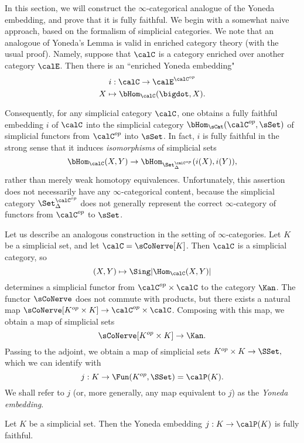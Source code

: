 In this section, we will construct the $\infty$-categorical analogue of the Yoneda embedding, and prove that it is fully faithful. We begin with a somewhat naive approach, based on the formalism of simplicial categories. We note that an analogoue of Yoneda's Lemma is valid in enriched category
theory (with the usual proof). Namely, suppose that $\calC$ is a category enriched over another category $\calE$. Then there is an ``enriched Yoneda embedding"
$$ i: \calC \rightarrow \calE^{\calC^{op}}$$
$$ X \mapsto \bHom_{\calC}( \bigdot, X).$$

Consequently, for any simplicial
category $\calC$, one obtains a fully faithful embedding $i$ of
$\calC$ into the simplicial category $\bHom_{\sCat}(\calC^{op}, \sSet)$ of
simplicial functors from $\calC^{op}$ into $\sSet$. In fact, $i$
is fully faithful in the strong sense that it induces {\em
isomorphisms} of simplicial sets$$ \bHom_{\calC}(X,Y) \rightarrow
\bHom_{\Set_{\Delta}^{\calC^{op}}}(i(X), i(Y)),$$ rather than merely
weak homotopy equivalences. Unfortunately, this assertion does not
necessarily have any $\infty$-categorical content, because the 
simplicial category $\Set_{\Delta}^{\calC^{op}}$ does not generally
represent the correct $\infty$-category of functors from
$\calC^{op}$ to $\sSet$.

Let us describe an analogous construction in the setting of $\infty$-categories. Let $K$ be a simplicial set, and let
$\calC = \sCoNerve[K]$. Then $\calC$ is a simplicial category, so
$$ (X,Y) \mapsto \Sing|\Hom_{\calC}(X,Y)|$$
determines a simplicial functor from
$ \calC^{op} \times \calC$ to the category $\Kan$.
The functor $\sCoNerve$ does not commute with products, but there
exists a natural map $\sCoNerve[K^{op} \times K] \rightarrow
\calC^{op} \times \calC$. Composing with this map, we obtain a map
of simplicial sets
$$ \sCoNerve[K^{op} \times K] \rightarrow \Kan.$$
Passing to the adjoint, we obtain a map of simplicial sets
$K^{op} \times K \rightarrow \SSet,$ which we can identify
with $$j: K \rightarrow
\Fun(K^{op}, \SSet) = \calP(K).$$
We shall refer to $j$ (or, more generally, any map equivalent to
$j$) as the {\it Yoneda embedding}.

\begin{proposition}\label{fulfaith}
Let $K$ be a simplicial set. Then the Yoneda embedding $j: K
\rightarrow \calP(K)$ is fully faithful.
\end{proposition}

